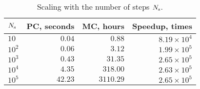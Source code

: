 \begin{table}
  \centering
  \caption{Scaling with the number of steps $N_\text{s}$.}
  \vspace{-10pt}
  \begin{tabular}{lrrr}
    \toprule
    $N_\text{s}$ & PC, seconds & MC, hours & Speedup, times \\
    \midrule
    $   10$ & $ 0.04$ & $   0.88$ & $8.19 \times 10^4$ \\
    $ 10^2$ & $ 0.06$ & $   3.12$ & $1.99 \times 10^5$ \\
    $ 10^3$ & $ 0.43$ & $  31.35$ & $2.65 \times 10^5$ \\
    $ 10^4$ & $ 4.35$ & $ 318.00$ & $2.63 \times 10^5$ \\
    $ 10^5$ & $42.23$ & $3110.29$ & $2.65 \times 10^5$ \\
    \bottomrule
  \end{tabular}
  \vspace{-10pt}
\end{table}
